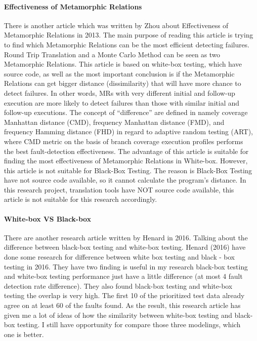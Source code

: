 \documentclass[conference]{IEEEtran}
\begin{document}
\paragraph{Effectiveness of Metamorphic Relations}
\cite{cao2013correlation}
There is another article which was written by Zhou about Effectiveness of
Metamorphic Relations in 2013.
The main purpose of reading this article is trying to find which Metamorphic
Relations can be the most efficient detecting failures.
Round Trip Translation and a Monte Carlo Method can be seen as two Metamorphic Relations.
This article is based on white-box testing, which have source code, as well as
the most important conclusion is if the Metamorphic Relations can get bigger
distance (dissimilarity) that will have more chance to detect failures.
In other words, MRs with very different initial and follow-up execution are more
likely to detect failures than those with similar initial and follow-up
executions.
The concept of ``difference'' are defined in namely coverage Manhattan distance
(CMD), frequency Manhattan distance (FMD), and frequency Hamming distance (FHD)
in regard to adaptive random testing (ART), where CMD metric on the basis of
branch coverage execution profiles performs the best fault-detection
effectiveness.
The advantage of this article is suitable for finding the most effectiveness of
Metamorphic Relations in White-box.
However, this article is not suitable for Black-Box Testing. The reason is
Black-Box Testing have not source code available, so it cannot calculate the
program’s distance.
In this research project, translation tools have NOT source code available, this
article is not suitable for this research accordingly.
\paragraph{White-box VS Black-box}
\cite{henard2016comparing}
There are another research article written by Henard in 2016. Talking about the difference between black-box testing and white-box testing.
Henard (2016) have done some research for difference between white box testing
and black - box testing in 2016. They have two finding is useful in my research
black-box testing and white-box testing performance just have a little
difference (at most 4 fault detection rate difference). They also found
black-box testing and white-box testing the overlap is
very high. The first 10 of the prioritized test data
already agree on at least 60 of the faults found. As the
result, this research article has given me a lot of ideas of how the similarity between white-box testing and black-box
testing. I still have opportunity for compare those three
modelings, which one is better.
\end{document}

